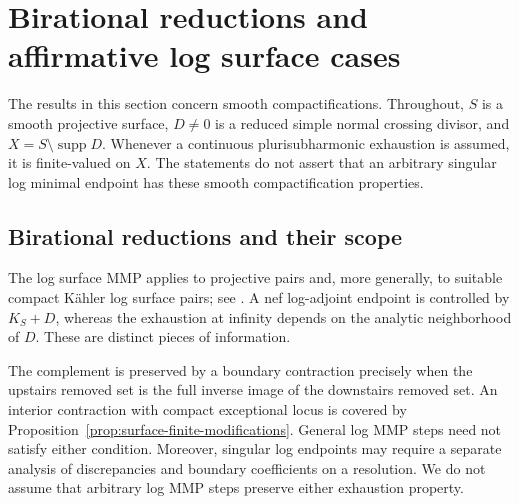 \documentclass[11pt]{amsart}
\theoremstyle{definition}
\theoremstyle{remark}
\numberwithin{equation}{section}
\newcommand{\supp}{\operatorname{supp}}
\begin{document}
\section{Birational reductions and affirmative log surface cases}
\label{sec:surface-log-cases}

The results in this section concern smooth compactifications.  Throughout,
$S$ is a smooth projective surface, $D\ne0$ is a reduced simple normal
crossing divisor, and $X=S\setminus\supp D$.  Whenever a continuous
plurisubharmonic exhaustion is assumed, it is finite-valued on $X$.
The statements do not assert that an arbitrary singular log minimal
endpoint has these smooth compactification properties.

\subsection{Birational reductions and their scope}
\label{sec:surface-mmp-scope}

The log surface MMP applies to projective pairs and, more generally,
to suitable compact K\"ahler log surface pairs; see
\cite{Fujino2012,Fujino2021}.  A nef log-adjoint endpoint is controlled
by $K_S+D$, whereas the exhaustion at infinity depends on the analytic
neighborhood of $D$.  These are distinct pieces of information.

The complement is preserved by a boundary contraction precisely when
the upstairs removed set is the full inverse image of the downstairs
removed set.  An interior contraction with compact exceptional locus
is covered by Proposition~\ref{prop:surface-finite-modifications}.
General log MMP steps need not satisfy either condition.  Moreover,
singular log endpoints may require a separate analysis of discrepancies
and boundary coefficients on a resolution.  We do not assume that
arbitrary log MMP steps preserve either exhaustion property.
\end{document}
